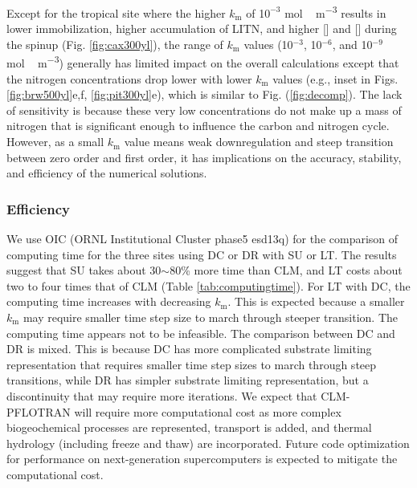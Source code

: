\documentclass[gmd, manuscript]{copernicus}
\begin{document}
Except for the tropical site where the higher $k_\text{m}$ of 1$0^{-3}$
\unit{mol\,m^{-3}} results in lower immobilization, higher accumulation of
LITN, and  higher [] and [] during the spinup (Fig.
\ref{fig:cax300yl}), the range of $k_\text{m}$ values (10$^{-3}$, 10$^{-6}$,
and 10$^{-9}$ \unit{mol\,m^{-3}}) generally has limited impact on the overall
calculations except that the nitrogen concentrations drop lower with lower
$k_\text{m}$ values (e.g., inset in Figs. \ref{fig:brw500yl}e,f,
\ref{fig:pit300yl}e), which is similar to Fig. (\ref{fig:decomp}). The lack of
sensitivity is because these very low concentrations do not make up a mass of
nitrogen that is significant enough to influence the carbon and nitrogen cycle.
However, as a small $k_\text{m}$ value means weak downregulation and steep transition
between zero order and first order, it has implications on the accuracy,
stability, and efficiency of the numerical solutions.

\subsubsection{Efficiency}
We use OIC (ORNL Institutional Cluster phase5 esd13q) for the comparison of
computing time for the three sites using DC or DR with SU or LT. The results
suggest that SU takes about 30$\sim$80\% more time than CLM, and LT costs about
two to four times that of CLM (Table \ref{tab:computingtime}). For LT with DC, the
computing time increases with decreasing $k_\text{m}$. This is expected because
a smaller $k_\text{m}$ may require smaller time step size to march through
steeper transition. The computing time appears not to be infeasible. The
comparison between DC and DR is mixed. This is because DC has more complicated
substrate limiting representation that requires smaller time step sizes to march
through steep transitions, while DR has simpler substrate limiting
representation, but a discontinuity that may require more iterations. We expect
that CLM-PFLOTRAN will require more computational cost as more complex
biogeochemical processes are represented, transport is added, and thermal
hydrology (including freeze and thaw) are incorporated. Future code
optimization for performance on next-generation supercomputers is expected to
mitigate the computational cost. 
\end{document}

